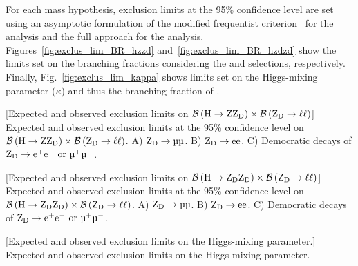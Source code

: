 For each mass hypothesis, exclusion limits at the 95\% confidence level are set using an asymptotic formulation of the modified frequentist \CLs criterion~\cite{cowan_asymptotic_2011, higgs_combo_proc_2011} for the \zzd analysis and the full \CLs approach for the \zdzd analysis.
Figures~\ref{fig:exclus_lim_BR_hzzd} and~\ref{fig:exclus_lim_BR_hzdzd} show the limits set on the branching fractions considering the \zzd and \zdzd selections, respectively.
Finally, Fig.~\ref{fig:exclus_lim_kappa} shows limits set on the Higgs-mixing parameter ($\kappa$) and thus the branching fraction of \htozdzd.
\begin{multiFigure}
        \centering
            [Expected and observed exclusion limits on $\mathcal{B} \left( \mathrm{H} \to \text{Z} \mathrm{Z}_\text{D} \right) \times \mathcal{B} \left( \mathrm{Z}_\text{D} \to \ell\ell \right)$] %
            {Expected and observed exclusion limits at the 95\% confidence level on $\mathcal{B} \left( \mathrm{H} \to \text{Z} \mathrm{Z}_\text{D} \right) \times \mathcal{B} \left( \mathrm{Z}_\text{D} \to \ell\ell \right)$. %
            A) $\PZD \to \mumu$.
            B) $\mathrm{Z}_\text{D} \to \mathrm{e} \mathrm{e}$.
            C) Democratic decays of $\zdtoeepmormumupm$.
            }
        \label{fig:exclus_lim_BR_hzzd}
\end{multiFigure}
\begin{multiFigure}
        \centering
            [Expected and observed exclusion limits on $\mathcal{B} \left( \mathrm{H} \to \mathrm{Z}_\text{D} \mathrm{Z}_\text{D} \right) \times \mathcal{B} \left( \mathrm{Z}_\text{D} \to \ell\ell \right)$] %
            {Expected and observed exclusion limits at the 95\% confidence level on $\mathcal{B} \left( \mathrm{H} \to \mathrm{Z}_\text{D} \mathrm{Z}_\text{D} \right) \times \mathcal{B} \left( \mathrm{Z}_\text{D} \to \ell\ell \right)$. %
            A) $\PZD \to \mumu$.
            B) $\mathrm{Z}_\text{D} \to \mathrm{e} \mathrm{e}$.
            C) Democratic decays of $\zdtoeepmormumupm$.
            }
        \label{fig:exclus_lim_BR_hzdzd}
\end{multiFigure}
\begin{multiFigure}
        \centering
            [Expected and observed exclusion limits on the Higgs-mixing parameter.] %
            {Expected and observed exclusion limits on the Higgs-mixing parameter.} %
        \label{fig:exclus_lim_kappa}
\end{multiFigure}

